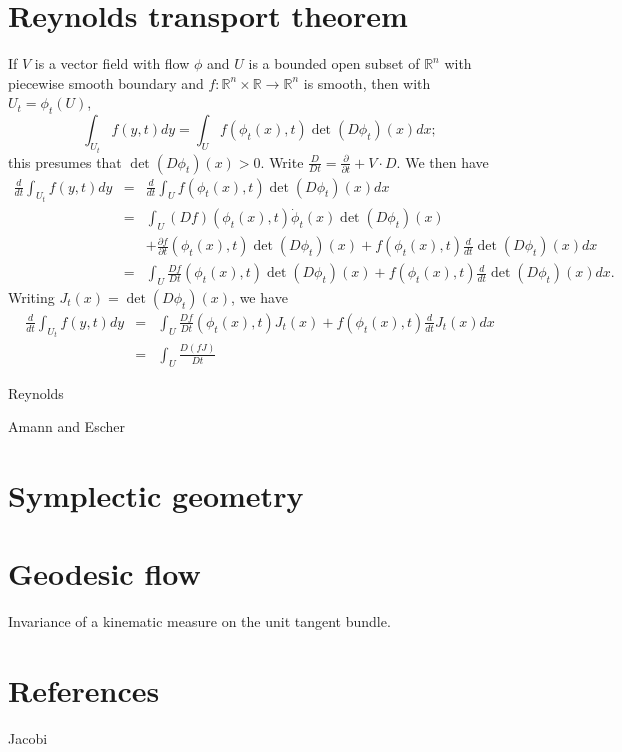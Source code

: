 \documentclass{article}
\theoremstyle{definition}
\begin{document}
\section{Reynolds transport theorem}
If $V$ is a vector field with flow $\phi$ and $U$ is a bounded open subset of $\mathbb{R}^n$ with piecewise smooth boundary and $f:\mathbb{R}^n \times \mathbb{R} \to 
\mathbb{R}^n$ is smooth, then with $U_t=\phi_t(U)$,
\[
\int_{U_t} f(y,t) dy = \int_U f(\phi_t(x),t) \det (D\phi_t)(x) dx;
\]
this presumes that $\det (D\phi_t)(x)>0$. Write $\frac{D}{Dt} = \frac{\partial}{\partial t} + V \cdot D$. 
We then have
\begin{eqnarray*}
\frac{d}{dt} \int_{U_t} f(y,t) dy& =& \frac{d}{dt}   \int_U f(\phi_t(x),t) \det (D\phi_t)(x) dx\\
& =&
\int_U (D f)(\phi_t(x),t) \dot{\phi}_t(x) \det (D\phi_t)(x) \\
&&+ \frac{\partial f}{\partial t}(\phi_t(x),t) \det (D\phi_t)(x)+f(\phi_t(x),t) \frac{d}{dt} \det(D\phi_t)(x) dx\\
&=&\int_U \frac{Df}{Dt}(\phi_t(x),t)  \det (D\phi_t)(x) +f(\phi_t(x),t) \frac{d}{dt} \det(D\phi_t)(x) dx.
\end{eqnarray*}
Writing $J_t(x) = \det (D\phi_t)(x)$, we have
\begin{eqnarray*}
\frac{d}{dt} \int_{U_t} f(y,t) dy&=&\int_U \frac{Df}{Dt}(\phi_t(x),t) J_t(x) +f(\phi_t(x),t) \frac{d}{dt}J_t(x) dx\\
&=&\int_U \frac{D(f J)}{Dt} 
\end{eqnarray*}


Reynolds \cite[pp.~12--13, art. 14]{reynolds}



Amann and Escher \cite[p.~425, Theorem 2.11]{amann}



\section{Symplectic geometry}



\section{Geodesic flow}
Invariance of a kinematic measure on the unit tangent bundle.


\section{References}
Jacobi \cite[p.~93]{jacobi}
\end{document}

